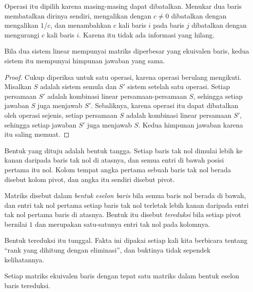Operasi itu dipilih karena masing-masing dapat dibatalkan. Menukar dua baris membatalkan
dirinya sendiri, mengalikan dengan $c\neq0$ dibatalkan dengan mengalikan $1/c$, dan
menambahkan $c$ kali baris $i$ pada baris $j$ dibatalkan dengan mengurangi $c$ kali baris
$i$. Karena itu tidak ada informasi yang hilang.

\begin{teorema}
Bila dua sistem linear mempunyai matriks diperbesar yang ekuivalen baris, kedua sistem itu
mempunyai himpunan jawaban yang sama.
\end{teorema}

\begin{proof}
Cukup diperiksa untuk satu operasi, karena operasi berulang mengikuti. Misalkan $S$ adalah
sistem semula dan $S'$ sistem setelah satu operasi. Setiap persamaan $S'$ adalah kombinasi
linear persamaan-persamaan $S$, sehingga setiap jawaban $S$ juga menjawab $S'$. Sebaliknya,
karena operasi itu dapat dibatalkan oleh operasi sejenis, setiap persamaan $S$ adalah
kombinasi linear persamaan $S'$, sehingga setiap jawaban $S'$ juga menjawab $S$. Kedua
himpunan jawaban karena itu saling memuat.
\end{proof}

Bentuk yang dituju adalah bentuk tangga. Setiap baris tak nol dimulai lebih ke kanan
daripada baris tak nol di atasnya, dan semua entri di bawah posisi pertama itu nol. Kolom
tempat angka pertama sebuah baris tak nol berada disebut kolom pivot, dan angka itu sendiri
disebut pivot.

\begin{definisi}
Matriks disebut dalam \emph{bentuk eselon baris} bila semua baris nol berada di bawah, dan
entri tak nol pertama setiap baris tak nol terletak lebih kanan daripada entri tak nol
pertama baris di atasnya. Bentuk itu disebut \emph{tereduksi} bila setiap pivot bernilai
$1$ dan merupakan satu-satunya entri tak nol pada kolomnya.
\end{definisi}

Bentuk tereduksi itu tunggal. Fakta ini dipakai setiap kali kita berbicara tentang ``rank
yang dihitung dengan eliminasi'', dan buktinya tidak sependek kelihatannya.

\begin{teorema}
Setiap matriks ekuivalen baris dengan tepat satu matriks dalam bentuk eselon baris
tereduksi.
\end{teorema}

